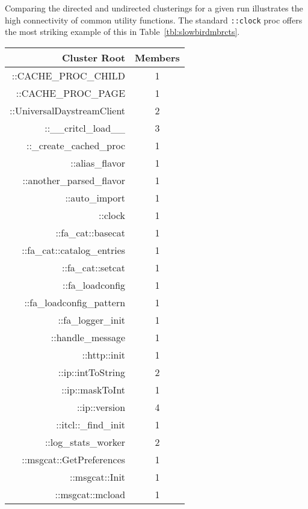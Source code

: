 \documentclass{article}[letter,10pt]
\begin{document}
{{{      Comparing the directed and undirected clusterings for a given run illustrates the high connectivity of common utility functions.
      The standard \texttt{::clock} proc offers the most striking example of this in Table~\ref{tbl:slowbirdmbrcts}.
        \begin{table}[htb]
          \begin{subtable}[t]{0.48\textwidth}
            {\footnotesize
            \begin{tabular}[t]{r|c}
              \toprule
              Cluster Root & Members \\
              \midrule
              ::CACHE\_PROC\_CHILD  & 1 \\
              ::CACHE\_PROC\_PAGE  & 1 \\
              ::UniversalDaystreamClient  & 2 \\
              ::\_\_critcl\_load\_\_  & 3 \\
              ::\_create\_cached\_proc  & 1 \\
              ::alias\_flavor  & 1 \\
              ::another\_parsed\_flavor  & 1 \\
              ::auto\_import  & 1 \\
              ::clock  & 1 \\
              ::fa\_cat::basecat  & 1 \\
              ::fa\_cat::catalog\_entries  & 1 \\
              ::fa\_cat::setcat  & 1 \\
              ::fa\_loadconfig  & 1 \\
              ::fa\_loadconfig\_pattern  & 1 \\
              ::fa\_logger\_init  & 1 \\
              ::handle\_message  & 1 \\
              ::http::init  & 1 \\
              ::ip::intToString  & 2 \\
              ::ip::maskToInt  & 1 \\
              ::ip::version  & 4 \\
              ::itcl::\_find\_init  & 1 \\
              ::log\_stats\_worker  & 2 \\
              ::msgcat::GetPreferences  & 1 \\
              ::msgcat::Init  & 1 \\
              ::msgcat::mcload  & 1 \\

\end{tabular}}
\end{subtable}
\end{table}}}}
\end{document}
